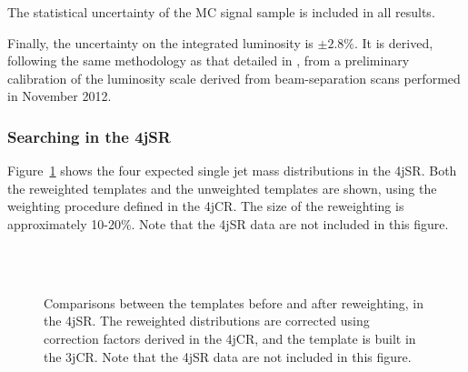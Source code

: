 


The statistical uncertainty of the MC signal sample is included in all results.


Finally, the uncertainty on the integrated luminosity is $\pm2.8\%$. It is derived, following the same methodology as that detailed in \cite{ATLASLumi}, from a preliminary calibration of the luminosity scale derived from beam-separation scans performed in November 2012.







\subsubsection{Searching in the 4jSR}





Figure~\ref{fig:search:search:4jsr:Reweight} shows the four expected single jet mass distributions in the 4jSR. Both the reweighted templates and the unweighted templates are shown, using the weighting procedure defined in the 4jCR. The size of the reweighting is approximately 10-20\%. Note that the 4jSR data are not included in this figure.

\begin{figure}[!ht]
  \centering
  
  \\
  \\
    
  \caption{Comparisons between the templates before and after reweighting, in the 4jSR. The reweighted distributions are corrected using correction factors derived in the 4jCR, and the template is built in the 3jCR. Note that the 4jSR data are not included in this figure.}
               
  \label{fig:search:search:4jsr:Reweight}
\end{figure}


